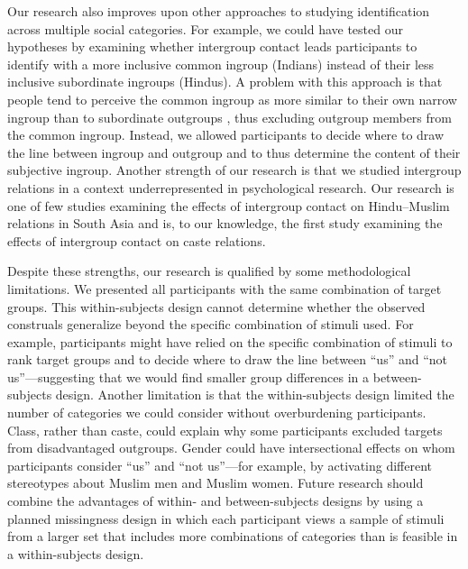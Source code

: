 \documentclass[12pt, a4paper]{article}
\begin{document}
Our research also improves upon other approaches to studying identification across multiple social categories. For example, we could have tested our hypotheses by examining whether intergroup contact leads participants to identify with a more inclusive common ingroup (Indians) instead of their less inclusive subordinate ingroups (Hindus). A problem with this approach is that people tend to perceive the common ingroup as more similar to their own narrow ingroup than to subordinate outgroups \parencite{wenzel_ingroup_2003}, thus excluding outgroup members from the common ingroup. Instead, we allowed participants to decide where to draw the line between ingroup and outgroup and to thus determine the content of their subjective ingroup. Another strength of our research is that we studied intergroup relations in a context underrepresented in psychological research. Our research is one of few studies examining the effects of intergroup contact on Hindu–Muslim relations in South Asia \parencite[for other examples, see][]{islam_dimensions_1993, tausch_relationships_2009} and is, to our knowledge, the first study examining the effects of intergroup contact on caste relations.

Despite these strengths, our research is qualified by some methodological limitations. We presented all participants with the same combination of target groups. This within-subjects design cannot determine whether the observed construals generalize beyond the specific combination of stimuli used. For example, participants might have relied on the specific combination of stimuli to rank target groups and to decide where to draw the line between “us” and “not us”---suggesting that we would find smaller group differences in a between-subjects design. Another limitation is that the within-subjects design limited the number of categories we could consider without overburdening participants. Class, rather than caste, could explain why some participants excluded targets from disadvantaged outgroups. Gender could have intersectional effects on whom participants consider “us” and “not us”---for example, by activating different stereotypes about Muslim men and Muslim women. Future research should combine the advantages of within- and between-subjects designs by using a planned missingness design in which each participant views a sample of stimuli from a larger set that includes more combinations of categories than is feasible in a within-subjects design.
\end{document}
